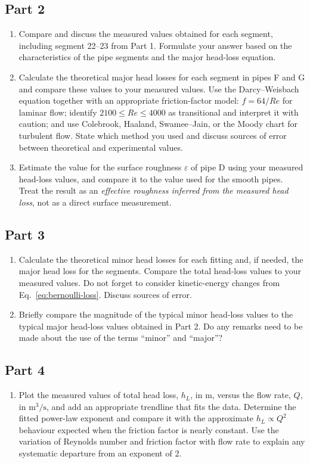 \documentclass[12pt,letterpaper]{article}
\begin{document}
\subsection*{Part 2}
\begin{enumerate}[leftmargin=*]
    \item Compare and discuss the measured values obtained for each segment, including segment 22--23 from Part 1. Formulate your answer based on the characteristics of the pipe segments and the major head-loss equation.
\item Calculate the theoretical major head losses for each segment in pipes F and G and compare these values to your measured values. Use the Darcy--Weisbach equation together with an appropriate friction-factor model: \(f=64/Re\) for laminar flow; identify \(2100 \le Re \le 4000\) as transitional and interpret it with caution; and use Colebrook, Haaland, Swamee--Jain, or the Moody chart for turbulent flow. State which method you used and discuss sources of error between theoretical and experimental values.
    \item Estimate the value for the surface roughness \(\varepsilon\) of pipe D using your measured head-loss values, and compare it to the value used for the smooth pipes. Treat the result as an \emph{effective roughness inferred from the measured head loss}, not as a direct surface measurement.
\end{enumerate}

\subsection*{Part 3}
\begin{enumerate}[leftmargin=*]
    \item Calculate the theoretical minor head losses for each fitting and, if needed, the major head loss for the segments. Compare the total head-loss values to your measured values. Do not forget to consider kinetic-energy changes from Eq.~\eqref{eq:bernoulli-loss}. Discuss sources of error.
    \item Briefly compare the magnitude of the typical minor head-loss values to the typical major head-loss values obtained in Part 2. Do any remarks need to be made about the use of the terms ``minor'' and ``major''?
\end{enumerate}

\subsection*{Part 4}
\begin{enumerate}[leftmargin=*]
\item Plot the measured values of total head loss, \(h_L\), in m, versus the flow rate, \(Q\), in \(\mathrm{m^3/s}\), and add an appropriate trendline that fits the data. Determine the fitted power-law exponent and compare it with the approximate \(h_L \propto Q^2\) behaviour expected when the friction factor is nearly constant. Use the variation of Reynolds number and friction factor with flow rate to explain any systematic departure from an exponent of 2.
\end{enumerate}
\end{document}
